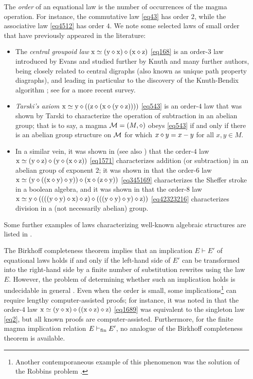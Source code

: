 The \emph{order} of an equational law is the number of occurrences of the magma operation. For instance, the commutative law \eqref{eq43} has order $2$, while the associative law \eqref{eq4512} has order $4$. We note some selected laws of small order that have previously appeared in the literature:
\begin{itemize}
\item The \emph{central groupoid law} $\mathrm{x} \simeq (\mathrm{y} \diamond \mathrm{x}) \diamond (\mathrm{x} \diamond \mathrm{z})$ \eqref{eq168} is an order-$3$ law introduced by Evans \cite{evans} and studied further by Knuth \cite{knuth} and many further authors, being closely related to central digraphs (also known as unique path property diagraphs), and leading in particular to the discovery of the Knuth-Bendix algorithm \cite{knuth-bendix}; see \cite{klt} for a more recent survey.
\item \emph{Tarski's axiom} $\mathrm{x} \simeq \mathrm{y} \diamond ( (\mathrm{z} \diamond (\mathrm{x} \diamond (\mathrm{y} \diamond \mathrm{z}))))$ \eqref{eq543} is an order-$4$ law that was shown by Tarski \cite{Tarski1938} to characterize the operation of subtraction in an abelian group; that is to say, a magma ${\mathcal{M}} = (M,\diamond)$ obeys \eqref{eq543} if and only if there is an abelian group structure on ${\mathcal{M}}$ for which $x \diamond y = x-y$ for all $x,y \in M$.
\item In a similar vein, it was shown in \cite{mendelsohn-padmanabhan} (see also \cite{meredith-prior}) that the order-$4$ law
$\mathrm{x} \simeq (\mathrm{y} \diamond \mathrm{z}) \diamond (\mathrm{y} \diamond (\mathrm{x} \diamond \mathrm{z}))$ \eqref{eq1571} characterizes addition (or subtraction) in an abelian group of exponent $2$; it was shown in \cite{mccune_et_al} that the order-$6$ law $\mathrm{x} \simeq (\mathrm{y} \diamond ((\mathrm{x} \diamond \mathrm{y}) \diamond \mathrm{y})) \diamond (\mathrm{x} \diamond (\mathrm{z} \diamond \mathrm{y}))$ \eqref{eq345169} characterizes the Sheffer stroke in a boolean algebra, and it was shown in \cite{higman-neumann} that the order-$8$ law
$\mathrm{x} \simeq \mathrm{y} \diamond ((((\mathrm{y} \diamond \mathrm{y}) \diamond \mathrm{x}) \diamond \mathrm{z}) \diamond (((\mathrm{y} \diamond \mathrm{y}) \diamond \mathrm{y}) \diamond \mathrm{z}))$ \eqref{eq42323216} characterizes division in a (not necessarily abelian) group.
\end{itemize}
Some further examples of laws characterizing well-known algebraic structures are listed in \cite{mccune-survey}.

The Birkhoff completeness theorem \cite[Th.~3.5.14]{term-rewriting} implies that an implication $E \vdash E'$ of equational laws holds if and only if the left-hand side of $E'$ can be transformed into the right-hand side by a finite number of substitution rewrites using the law $E$. However, the problem of determining whether such an implication holds is undecidable in general \cite{mckenzie}. Even when the order is small, some implications\footnote{Another contemporaneous example of this phenomenon was the solution of the Robbins problem \cite{robbins}.} can require lengthy computer-assisted proofs; for instance, it was noted in \cite{Kisielewicz2} that the order-$4$ law $\mathrm{x} \simeq (\mathrm{y} \diamond \mathrm{x}) \diamond ((\mathrm{x} \diamond \mathrm{z}) \diamond \mathrm{z})$ \eqref{eq1689} was equivalent to the singleton law \eqref{eq2}, but all known proofs are computer-assisted.  Furthermore, for the finite magma implication relation $E \vdash_{\mathrm{fin}} E'$, no analogue of the Birkhoff completeness theorem is available.

